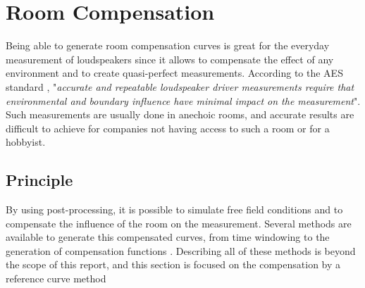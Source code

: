 \documentclass{report}
\begin{document}
\chapter{Room Compensation}

Being able to generate room compensation curves is great for the everyday measurement of loudspeakers since it allows to compensate the effect of any environment and to create quasi-perfect measurements. According to the AES standard \cite{aesstandart}, "\textit{accurate and repeatable loudspeaker driver measurements require that environmental and boundary influence have minimal impact on the measurement}". Such measurements are usually done in anechoic rooms, and accurate results are difficult to achieve for companies not having access to such a room or for a hobbyist.

\section{Principle}

By using post-processing, it is possible to simulate free field conditions and to compensate the influence of the room on the measurement. Several methods are available to generate this compensated curves, from time windowing to the generation of compensation functions \citep[see][]{aeswb}. Describing all of these methods is beyond the scope of this report, and this section is focused on the compensation by a reference curve method \\
\end{document}
